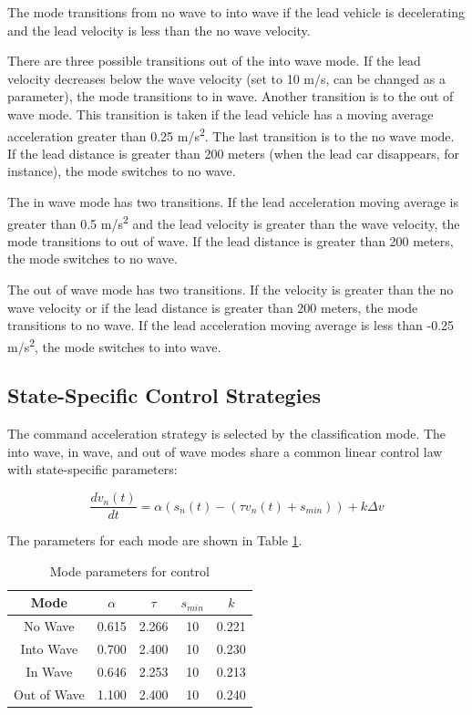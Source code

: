 \documentclass[conference]{IEEEtran}
\begin{document}
The mode transitions from no wave to into wave if the lead vehicle is decelerating and the lead velocity is less than the no wave velocity.

There are three possible transitions out of the into wave mode. If the lead velocity decreases below the wave velocity (set to 10 m/s, can be changed as a parameter), the mode transitions to in wave. Another transition is to the out of wave mode. This transition is taken if the lead vehicle has a moving average acceleration greater than 0.25 m/s\textsuperscript{2}. The last transition is to the no wave mode. If the lead distance is greater than 200 meters (when the lead car disappears, for instance), the mode switches to no wave.

The in wave mode has two transitions. If the lead acceleration moving average is greater than 0.5 m/s\textsuperscript{2} and the lead velocity is greater than the wave velocity, the mode transitions to out of wave. If the lead distance is greater than 200 meters, the mode switches to no wave.

The out of wave mode has two transitions. If the velocity is greater than the no wave velocity or if the lead distance is greater than 200 meters, the mode transitions to no wave. If the lead acceleration moving average is less than -0.25 m/s\textsuperscript{2}, the mode switches to into wave.


\subsection{State-Specific Control Strategies}

The command acceleration strategy is selected by the classification mode. The into wave, in wave, and out of wave modes share a common linear control law with state-specific parameters:

\begin{equation}
    \frac{dv_n(t)}{dt} = \alpha (s_n(t)-(\tau v_n(t) + s_{min})) + k \Delta v
\end{equation}

The parameters for each mode are shown in Table \ref{tab:mode_param}.

\begin{table}[htbp]
\caption{Mode parameters for control}
\begin{center}
\begin{tabular}{|c|c|c|c|c|}
\hline
Mode & $\alpha$ & $\tau$ & $s_{min}$ & $k$ \\
\hline
No Wave & 0.615 & 2.266 & 10 & 0.221 \\
\hline
Into Wave & 0.700 & 2.400 & 10 & 0.230 \\
\hline
In Wave & 0.646 & 2.253 & 10 & 0.213 \\
\hline
Out of Wave & 1.100 & 2.400 & 10 & 0.240 \\
\hline
\end{tabular}
\label{tab:mode_param}
\end{center}
\end{table}
\end{document}
